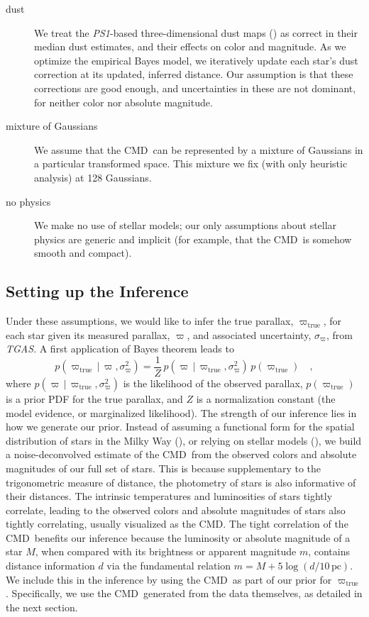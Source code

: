 \documentclass[modern]{aastex61}
\newcommand{\acronym}[1]{{\small{#1}}}
\newcommand{\project}[1]{\textsl{#1}}
\newcommand{\tgas}{\project{\acronym{TGAS}}}
\newcommand{\psone}{\project{\acronym{PS1}}}
\newcommand{\cmd}{\acronym{CMD}}
\newcommand{\given}{\,|\,}
\newcommand{\true}{\mathrm{true}}
\begin{document}
\begin{description}
\item[dust] We treat the \psone-based three-dimensional dust maps (\citealt{green15})
  as correct in their median dust estimates, and their
  effects on color and magnitude. As we optimize the empirical Bayes model, we iteratively update each star's
  dust correction at its updated, inferred distance. Our assumption is that these corrections are
  good enough, and uncertainties in these are not dominant, for neither
  color nor absolute magnitude.
\item[mixture of Gaussians] We assume that the \cmd\ can be represented by a mixture of
  Gaussians in a particular transformed space. This mixture we fix
  (with only heuristic analysis) at 128 Gaussians.
\item[no physics] We make no use of stellar models; our only assumptions about
  stellar physics are generic and implicit (for example, that the
  \cmd\ is somehow smooth and compact).
\end{description}

\subsection{Setting up the Inference}

Under these assumptions, we would like to infer the true parallax, $\varpi_{\true}$, for each star given its measured parallax, $\varpi$, and associated uncertainty, $\sigma_{\varpi}$, from \tgas.
A first application of Bayes theorem leads to
\begin{equation}
p(\varpi_{\true} \given \varpi, \sigma^2_{\varpi}) = \frac{1}{Z}\,p(\varpi \given \varpi_{\true}, \sigma^2_{\varpi}) \, p(\varpi_{\true}) \quad ,
\label{eq:bayes}
\end{equation}
where $p(\varpi \given \varpi_{\true}, \sigma^2_{\varpi})$ is the likelihood of the observed parallax, $p(\varpi_{\true})$ is a prior PDF for the true
parallax, and $Z$ is a normalization constant (the model evidence, or marginalized likelihood).
The strength of our inference lies in how we generate our prior.
Instead of assuming a functional form for the spatial distribution of stars in the Milky Way (\citealt{astraatmadja16b}), or relying on stellar models (\citealt{gaia16}), we build a noise-deconvolved estimate of the \cmd\ from the observed colors and absolute magnitudes of our full set of stars.
This is because supplementary to the trigonometric measure of distance, the photometry of stars is also informative of their distances.
The intrinsic temperatures and luminosities of stars tightly correlate, leading to the observed colors and absolute magnitudes of stars also tightly correlating, usually visualized as the \cmd.
The tight correlation of the \cmd\ benefits our inference because the luminosity or absolute magnitude of a star $M$, when compared with its brightness or apparent magnitude $m$, contains distance information $d$ via the fundamental relation $m=M+5\log(d/10\, \mathrm{pc})$.
We include this in the inference by using the \cmd\ as part of our prior for $\varpi_{\true}$.
Specifically, we use the \cmd\ generated from the data themselves, as detailed in the next section.
\end{document}
